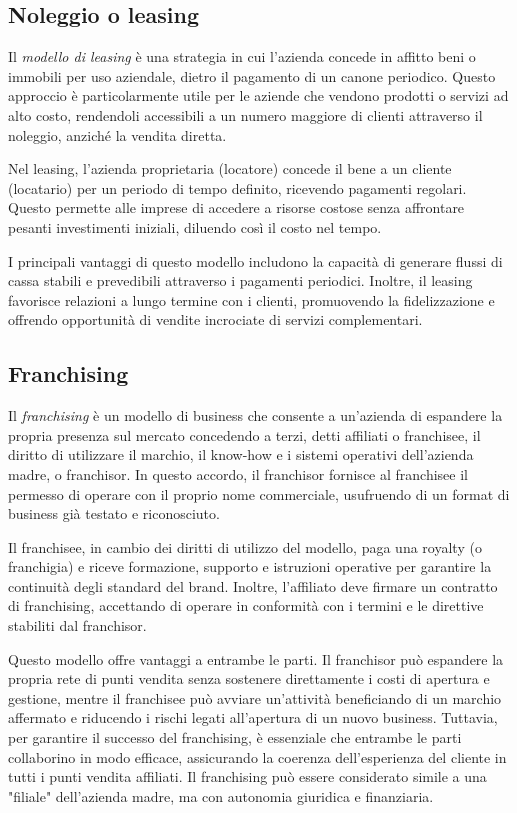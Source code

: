 \subsection*{Noleggio o leasing}
Il \textit{modello di leasing} è una strategia in cui l’azienda concede in affitto beni o immobili per uso aziendale, dietro il pagamento di un canone periodico. Questo approccio è particolarmente utile per le aziende che vendono prodotti o servizi ad alto costo, rendendoli accessibili a un numero maggiore di clienti attraverso il noleggio, anziché la vendita diretta.

Nel leasing, l’azienda proprietaria (locatore) concede il bene a un cliente (locatario) per un periodo di tempo definito, ricevendo pagamenti regolari. Questo permette alle imprese di accedere a risorse costose senza affrontare pesanti investimenti iniziali, diluendo così il costo nel tempo.

I principali vantaggi di questo modello includono la capacità di generare flussi di cassa stabili e prevedibili attraverso i pagamenti periodici. Inoltre, il leasing favorisce relazioni a lungo termine con i clienti, promuovendo la fidelizzazione e offrendo opportunità di vendite incrociate di servizi complementari.

\subsection*{Franchising}
Il \textit{franchising} è un modello di business che consente a un’azienda di espandere la propria presenza sul mercato concedendo a terzi, detti affiliati o franchisee, il diritto di utilizzare il marchio, il know-how e i sistemi operativi dell’azienda madre, o franchisor. In questo accordo, il franchisor fornisce al franchisee il permesso di operare con il proprio nome commerciale, usufruendo di un format di business già testato e riconosciuto.

Il franchisee, in cambio dei diritti di utilizzo del modello, paga una royalty (o franchigia) e riceve formazione, supporto e istruzioni operative per garantire la continuità degli standard del brand. Inoltre, l’affiliato deve firmare un contratto di franchising, accettando di operare in conformità con i termini e le direttive stabiliti dal franchisor.

Questo modello offre vantaggi a entrambe le parti. Il franchisor può espandere la propria rete di punti vendita senza sostenere direttamente i costi di apertura e gestione, mentre il franchisee può avviare un’attività beneficiando di un marchio affermato e riducendo i rischi legati all’apertura di un nuovo business. Tuttavia, per garantire il successo del franchising, è essenziale che entrambe le parti collaborino in modo efficace, assicurando la coerenza dell’esperienza del cliente in tutti i punti vendita affiliati. Il franchising può essere considerato simile a una "filiale" dell’azienda madre, ma con autonomia giuridica e finanziaria.

